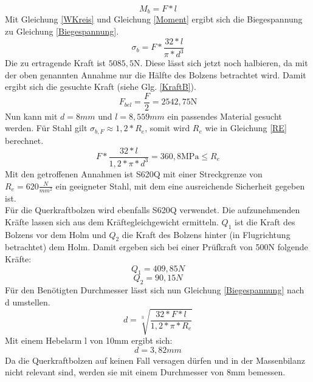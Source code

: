  \begin{equation}
 \label{Moment}
 	M_{b}=F*l
 \end{equation}
 Mit Gleichung \ref{WKreis} und Gleichung \ref{Moment} ergibt sich die Biegespannung zu Gleichung \ref{Biegespannung}.
 \begin{equation}
 \label{Biegespannung}
 	\sigma_{b}=F*\frac{32*l}{\pi*d^{3}}
 \end{equation}
Die zu ertragende Kraft ist $5085,5 \mathrm{N}$. Diese lässt sich jetzt noch halbieren, da mit der oben genannten Annahme nur die Hälfte des Bolzens betrachtet wird. Damit ergibt sich die gesuchte Kraft (siehe Glg. \ref{KraftB}).
 \begin{equation}
 \label{KraftB}
 	F_{bel}=\frac{F}{2} =2542,75 \mathrm{N}
 \end{equation}
 Nun kann mit $d=8mm$ und $l=8,559mm$ ein passendes Material gesucht werden. Für Stahl gilt $\sigma_{b,F}\approx1,2*R_{e}$, somit wird $R_{e}$ wie in Gleichung \ref{RE} berechnet. 
 \begin{equation}
 \label{RE}
 	F*\frac{32*l}{1,2*\pi*d^{3}}=360,8\mathrm{MPa}\leq
R_{e} \end{equation}  
\noindent
Mit den getroffenen Annahmen ist S620Q mit einer Streckgrenze von $R_{e}=620\frac{N}{mm^{2}}$ ein geeigneter Stahl, mit dem eine ausreichende Sicherheit gegeben ist.\\
\noindent
Für die Querkraftbolzen wird ebenfalls S620Q verwendet. Die aufzunehmenden Kräfte lassen sich aus dem Kräftegleichgewicht ermitteln. $Q_{1}$ ist die Kraft des Bolzens vor dem Holm und $Q_{2}$ die Kraft des Bolzens hinter (in Flugrichtung betrachtet) dem Holm. Damit ergeben sich bei einer Prüfkraft von 500N folgende Kräfte:
$$Q_{1}=409,85N$$
$$Q_{2}=90,15N$$
Für den Benötigten Durchmesser lässt sich nun Gleichung \ref{Biegespannung} nach d umstellen.
\begin{equation}
d=\sqrt[3]{\frac{32*F*l}{1,2*\pi*R_{e}}}
\end{equation}
Mit einem Hebelarm l von 10mm ergibt sich:
\begin{equation}
d=3,82mm
\end{equation}
Da die Querkraftbolzen auf keinen Fall versagen dürfen und in der Massenbilanz nicht relevant sind, werden sie mit einem Durchmesser von 8mm bemessen.\cite{item6}\\
 
 
 
 
  
 
